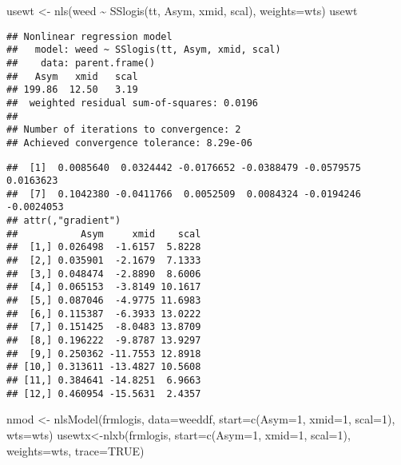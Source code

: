 \documentclass[
]{article}
\newenvironment{Shaded}{\begin{snugshade}}{\end{snugshade}}
\newcommand{\AttributeTok}[1]{\textcolor[rgb]{0.77,0.63,0.00}{#1}}
\newcommand{\ConstantTok}[1]{\textcolor[rgb]{0.00,0.00,0.00}{#1}}
\newcommand{\DecValTok}[1]{\textcolor[rgb]{0.00,0.00,0.81}{#1}}
\newcommand{\FunctionTok}[1]{\textcolor[rgb]{0.00,0.00,0.00}{#1}}
\newcommand{\NormalTok}[1]{#1}
\newcommand{\OtherTok}[1]{\textcolor[rgb]{0.56,0.35,0.01}{#1}}
\newcommand{\SpecialCharTok}[1]{\textcolor[rgb]{0.00,0.00,0.00}{#1}}
\begin{document}
\begin{Shaded}
\begin{Highlighting}[]
\NormalTok{usewt }\OtherTok{\textless{}{-}} \FunctionTok{nls}\NormalTok{(weed }\SpecialCharTok{\textasciitilde{}} \FunctionTok{SSlogis}\NormalTok{(tt, Asym, xmid, scal), }\AttributeTok{weights=}\NormalTok{wts)}
\NormalTok{usewt}
\end{Highlighting}
\end{Shaded}

\begin{verbatim}
## Nonlinear regression model
##   model: weed ~ SSlogis(tt, Asym, xmid, scal)
##    data: parent.frame()
##   Asym   xmid   scal 
## 199.86  12.50   3.19 
##  weighted residual sum-of-squares: 0.0196
## 
## Number of iterations to convergence: 2 
## Achieved convergence tolerance: 8.29e-06
\end{verbatim}

\begin{Shaded}
\end{Shaded}

\begin{verbatim}
##  [1]  0.0085640  0.0324442 -0.0176652 -0.0388479 -0.0579575  0.0163623
##  [7]  0.1042380 -0.0411766  0.0052509  0.0084324 -0.0194246 -0.0024053
## attr(,"gradient")
##           Asym     xmid    scal
##  [1,] 0.026498  -1.6157  5.8228
##  [2,] 0.035901  -2.1679  7.1333
##  [3,] 0.048474  -2.8890  8.6006
##  [4,] 0.065153  -3.8149 10.1617
##  [5,] 0.087046  -4.9775 11.6983
##  [6,] 0.115387  -6.3933 13.0222
##  [7,] 0.151425  -8.0483 13.8709
##  [8,] 0.196222  -9.8787 13.9297
##  [9,] 0.250362 -11.7553 12.8918
## [10,] 0.313611 -13.4827 10.5608
## [11,] 0.384641 -14.8251  6.9663
## [12,] 0.460954 -15.5631  2.4357
\end{verbatim}

\begin{Shaded}
\begin{Highlighting}[]
\NormalTok{nmod }\OtherTok{\textless{}{-}} \FunctionTok{nlsModel}\NormalTok{(frmlogis, }\AttributeTok{data=}\NormalTok{weeddf, }\AttributeTok{start=}\FunctionTok{c}\NormalTok{(}\AttributeTok{Asym=}\DecValTok{1}\NormalTok{, }\AttributeTok{xmid=}\DecValTok{1}\NormalTok{, }\AttributeTok{scal=}\DecValTok{1}\NormalTok{), }\AttributeTok{wts=}\NormalTok{wts)}
\NormalTok{usewtx}\OtherTok{\textless{}{-}}\FunctionTok{nlxb}\NormalTok{(frmlogis,  }\AttributeTok{start=}\FunctionTok{c}\NormalTok{(}\AttributeTok{Asym=}\DecValTok{1}\NormalTok{, }\AttributeTok{xmid=}\DecValTok{1}\NormalTok{, }\AttributeTok{scal=}\DecValTok{1}\NormalTok{), }\AttributeTok{weights=}\NormalTok{wts, }\AttributeTok{trace=}\ConstantTok{TRUE}\NormalTok{)}
\end{Highlighting}
\end{Shaded}
\end{document}
